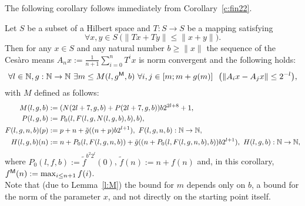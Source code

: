The following corollary follows immediately from Corollary~\ref{c:fin22}.
\begin{cor} \label{c:fin21}
Let $S$ be a subset of a Hilbert space and $T:S\to S$
be a mapping satisfying
\[
\forall x,y\in S\ \big(\| Tx + Ty \| \leq \|x + y\|\big).
\]
Then for any $x\in S$ and any natural number $b\geq \|x\|$ the sequence of the Ces{\`a}ro means
$
A_nx:=\frac{1}{n+1}\sum^{n}_{i=0} T^i x
$
is norm convergent and the following holds:
\[
\forall l\in\mathbb{N},g:\mathbb{N}\to\mathbb{N}\ \exists m\leq M(l,g\protect{^{\textsf{\upshape M}}},b)\ \forall i,j\in[m;m+g(m)]\ \ \big( \|A_{i}x-A_{j}x\|\leq 2^{-l}\big ),
\]
with $M$ defined as follows:
\begin{align*}
M(l,g,b)&:=(N( 2l+7, g,b) + P( 2l+7, g,b)){b}2^{2l+8}+1,\\
P(l,g,b)&:=P_0(l,F(l,g,N(l,g,b),b),b),\\
F(l,g,n,b)(p) &:= p+n+\tilde g((n + p){b}2^{l+1}),\ F(l,g,n,b):\mathbb{N}\to\mathbb{N},\\
H(l,g,b)(n) &:= n+P_0(l,F(l,g,n,b))+\tilde g((n + P_0(l,F(l,g,n,b),b)){b}2^{l+1}),\ H(l,g,b):\mathbb{N}\to\mathbb{N},\\
\end{align*}
where $P_0(l,f,b):=\tilde f^{ b^2 2^l}(0)$, $\tilde f(n):=n+f(n)$ and, in this corollary, $f\protect{^{\textsf{\upshape M}}}(n):=\max_{i\leq n+1} f(i)$.\\

Note that (due to Lemma~\ref{l:M}) the bound for $m$ depends only on $b$, a bound for the norm of the
parameter $x$, and not directly on the starting point itself.
\end{cor}

